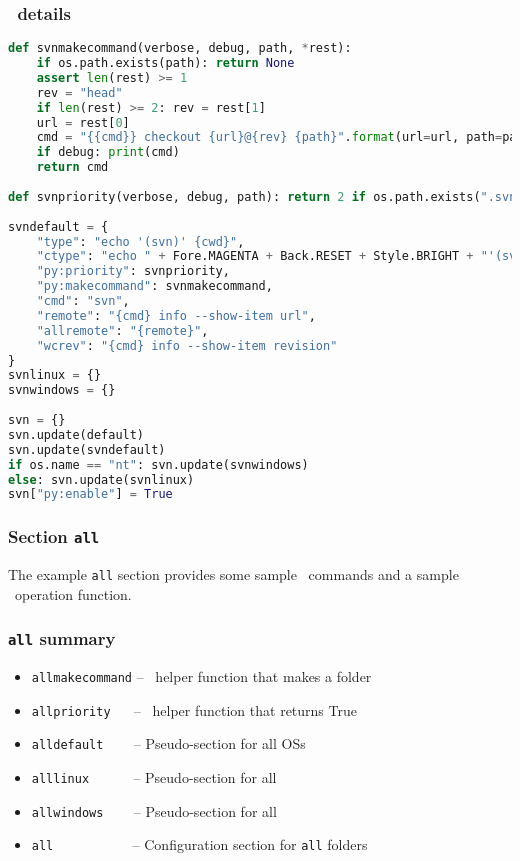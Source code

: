 \subsubsection*{\svn\ details}

\begin{snugshade}
\begin{lstlisting}[language=python]
def svnmakecommand(verbose, debug, path, *rest):
	if os.path.exists(path): return None
	assert len(rest) >= 1
	rev = "head"
	if len(rest) >= 2: rev = rest[1]
	url = rest[0]
	cmd = "{{cmd}} checkout {url}@{rev} {path}".format(url=url, path=path, rev=rev)
	if debug: print(cmd)
	return cmd
	
def svnpriority(verbose, debug, path): return 2 if os.path.exists(".svn") else 0
	
svndefault = {
	"type": "echo '(svn)' {cwd}",
	"ctype": "echo " + Fore.MAGENTA + Back.RESET + Style.BRIGHT + "'(svn)'" + Fore.RESET + " {cwd}",
	"py:priority": svnpriority,
	"py:makecommand": svnmakecommand,
	"cmd": "svn",
	"remote": "{cmd} info --show-item url",
	"allremote": "{remote}",
	"wcrev": "{cmd} info --show-item revision"
}
svnlinux = {}
svnwindows = {}
	
svn = {}
svn.update(default)
svn.update(svndefault)
if os.name == "nt": svn.update(svnwindows)
else: svn.update(svnlinux)
svn["py:enable"] = True
\end{lstlisting}
\end{snugshade}

\subsubsection{Section \lstinline{all}}

The example \lstinline{all} section provides some sample \Linux\ commands and a sample \Python\ operation function.

\subsubsection*{\lstinline{all} summary}

\begin{itemize}
\item \lstinline{allmakecommand} -- \Python\ helper function that makes a folder
\item \lstinline{allpriority} ~~ -- \Python\ helper function that returns True
\item \lstinline{alldefault} ~~~ -- Pseudo-section for all OSs
\item \lstinline{alllinux} ~~~~~ -- Pseudo-section for all \Linux
\item \lstinline{allwindows} ~~~ -- Pseudo-section for all \Windows
\item \lstinline{all} ~~~~~~~~~~ -- Configuration section for \lstinline{all} folders
\end{itemize}

